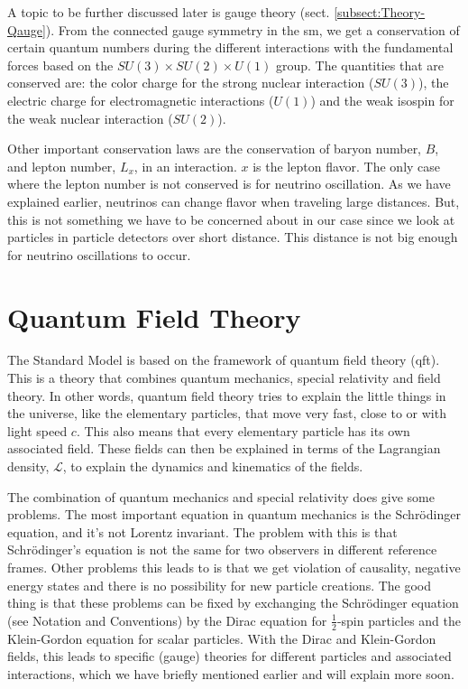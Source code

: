 \documentclass[a4paper, american, 12pt]{report}
\begin{document}
	A topic to be further discussed later is gauge theory (sect. \ref{subsect:Theory-Qauge}). From the connected gauge symmetry in the \acrshort{sm}, we get a conservation of certain quantum numbers during the different interactions with the fundamental forces based on the $SU(3)\times SU(2)\times U(1)$ group. The quantities that are conserved are: the color charge for the strong nuclear interaction ($SU(3)$), the electric charge for electromagnetic interactions ($U(1)$) and the weak isospin for the weak nuclear interaction ($SU(2)$).
	
	Other important conservation laws are the conservation of baryon number, $B$, and lepton number, $L_x$, in an interaction. $x$ is the lepton flavor. The only case where the lepton number is not conserved is for neutrino oscillation. As we have explained earlier, neutrinos can change flavor when traveling large distances. But, this is not something we have to be concerned about in our case since we look at particles in particle detectors over short distance. This distance is not big enough for neutrino oscillations to occur.
	

	\section{Quantum Field Theory}
	\label{sect:Theory-QFT}
	The Standard Model is based on the framework of quantum field theory (\acrshort{qft}). This is a theory that combines quantum mechanics, special relativity and field theory. In other words, quantum field theory tries to explain the little things in the universe, like the elementary particles, that move very fast, close to or with light speed $c$. This also means that every elementary particle has its own associated field. These fields can then be explained in terms of the Lagrangian density, $\mathcal{L}$, to explain the dynamics and kinematics of the fields.
	
	The combination of quantum mechanics and special relativity does give some problems. The most important equation in quantum mechanics is the Schrödinger equation, and it's not Lorentz invariant. The problem with this is that Schrödinger's equation is not the same for two observers in different reference frames. Other problems this leads to is that we get violation of causality, negative energy states and there is no possibility for new particle creations. The good thing is that these problems can be fixed by exchanging the Schrödinger equation (see Notation and Conventions) by the Dirac equation \cite{mandl2010quantum}\cite{Bellac1991QuantumAS} for $\frac{1}{2}$-spin particles and the Klein-Gordon equation \cite{mandl2010quantum}\cite{Bellac1991QuantumAS} for scalar particles. With the Dirac and Klein-Gordon fields, this leads to specific (gauge) theories for different particles and associated interactions, which we have briefly mentioned earlier and will explain more soon.
	
\end{document}
